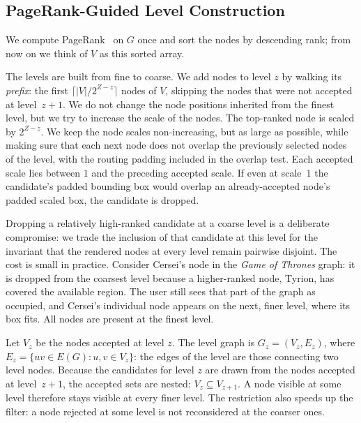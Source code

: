 \documentclass[review]{vgtc}          %
\begin{document}
\subsection{PageRank-Guided Level Construction}
\label{sec:filter}
We compute PageRank~\cite{page1999pagerank} on $G$ once and sort the
nodes by descending rank; from now on we think of $V$ as this sorted
array.

The levels are built from fine to coarse. We add nodes to level $z$
by walking its \emph{prefix}: the first $\lceil|V|/2^{Z-z}\rceil$
nodes of $V$, skipping the nodes that were not accepted at
level~$z+1$. We do not change the node
positions inherited from the finest level, but we try to increase the
scale of the nodes. The top-ranked node is scaled by $2^{Z-z}$. We keep the node
scales non-increasing, but as large as possible, while making sure
that each next node does not overlap the previously selected nodes of
the level, with the routing padding included in the overlap test. Each
accepted scale lies between $1$ and the preceding accepted scale. If
even at scale~$1$ the candidate's padded bounding box would overlap an
already-accepted node's padded scaled box, the candidate is dropped.

Dropping a relatively high-ranked candidate at a coarse level is a
deliberate compromise: we trade the inclusion of that candidate at
this level for the invariant that the rendered nodes at every level
remain pairwise disjoint. The cost is small in practice. Consider
Cersei's node in the \emph{Game of Thrones} graph: it is dropped from
the coarsest level because a higher-ranked node, Tyrion, has covered
the available region. The user still sees that part of the graph as
occupied, and Cersei's individual node appears on the next, finer
level, where its box fits. All nodes are present at the finest level.

Let $V_z$ be the nodes accepted at level $z$. The level graph is
$G_z=(V_z,E_z)$, where $E_z=\{uv\in E(G): u,v\in V_z\}$: the edges of
the level are those connecting two level nodes. Because the
candidates for level $z$ are drawn from the nodes accepted at
level~$z+1$, the accepted sets are nested: $V_z\subseteq V_{z+1}$.
A node visible at some level therefore stays visible at every finer
level. The restriction also speeds up the filter: a node rejected at
some level is not reconsidered at the coarser ones.
\end{document}
